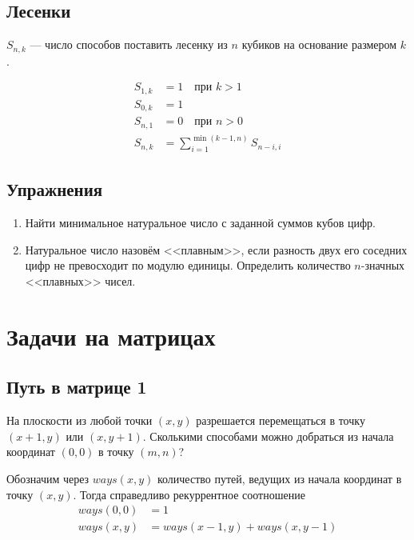 \documentclass[14pt,openany]{book}
\begin{document}
\section{Лесенки}

$S_{n,k}$ --- число способов поставить лесенку из $n$ кубиков на основание размером $k$.

\begin{align*}
S_{1,k} &= 1 \quad \text{при $k>1$} \\
S_{0,k} &= 1 \\
S_{n,1} &= 0 \quad \text{при $n>0$} \\
S_{n,k} &= \sum_{i=1}^{\min(k-1, n)}S_{n-i,i}
\end{align*}

\section{Упражнения}

\begin{enumerate}

\item Найти минимальное натуральное число с заданной суммов кубов цифр.

\item Натуральное число назовём <<плавным>>, если разность двух его соседних цифр не превосходит
      по модулю единицы. Определить количество $n$-значных <<плавных>> чисел.

\end{enumerate}

\chapter{Задачи на матрицах}

\section{Путь в матрице 1}

На плоскости из любой точки $(x, y)$ разрешается перемещаться в точку $(x+1,y)$ или $(x,y+1)$.
Сколькими способами можно добраться из начала координат $(0,0)$ в точку $(m,n)$?

Обозначим через $ways(x,y)$ количество путей, ведущих из начала координат в точку $(x,y)$.
Тогда справедливо рекуррентное соотношение
\begin{align*}
ways(0,0) &= 1 \\
ways(x,y) &= ways(x-1,y) + ways(x,y-1)
\end{align*}
\end{document}

